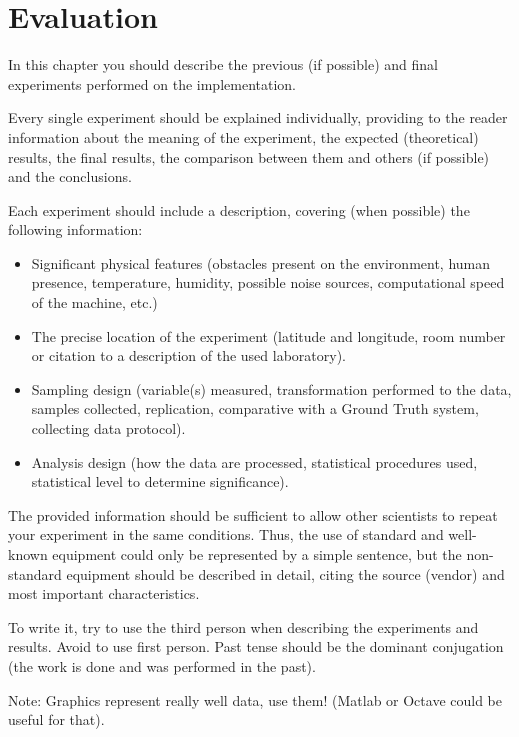 \chapter{Evaluation}

In this chapter you should describe the previous (if possible) and final experiments performed on the implementation.

Every single experiment should be explained individually, providing to the reader information about the meaning of the experiment, the expected (theoretical) results, the final results, the comparison between them and others (if possible) and the conclusions. 

Each experiment should include a description, covering (when possible) the following information:
\begin{itemize}
	\item Significant physical features (obstacles present on the environment, human presence, temperature, humidity, possible noise sources, computational speed of the machine, etc.)
	\item The precise location of the experiment (latitude and longitude, room number or citation to a description of the used laboratory).
	\item Sampling design (variable(s) measured, transformation performed to the data, samples collected, replication, comparative with a Ground Truth system, collecting data protocol).
	\item Analysis design (how the data are processed, statistical procedures used, statistical level to determine significance).
\end{itemize}
The provided information should be sufficient to allow other scientists to repeat your experiment in the same conditions. Thus, the use of standard and well-known equipment could only be represented by a simple sentence, but the non-standard equipment should be described in detail, citing the source (vendor) and most important characteristics.

To write it, try to use the third person when describing the experiments and results. Avoid to use first person. Past tense should be the dominant conjugation (the work is done and was performed in the past).

Note: Graphics represent really well data, use them! (Matlab or Octave could be useful for that).
